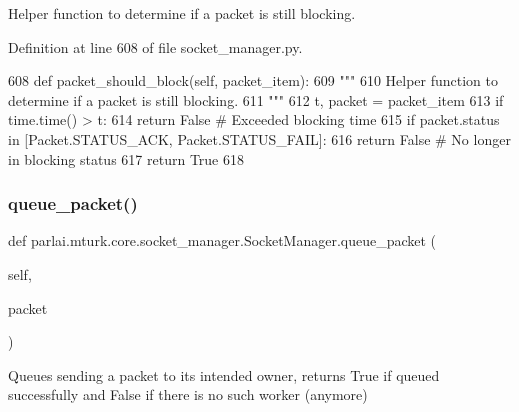 \begin{DoxyVerb}Helper function to determine if a packet is still blocking.
\end{DoxyVerb}
 

Definition at line 608 of file socket\+\_\+manager.\+py.


\begin{DoxyCode}
608     \textcolor{keyword}{def }packet\_should\_block(self, packet\_item):
609         \textcolor{stringliteral}{"""}
610 \textcolor{stringliteral}{        Helper function to determine if a packet is still blocking.}
611 \textcolor{stringliteral}{        """}
612         t, packet = packet\_item
613         \textcolor{keywordflow}{if} time.time() > t:
614             \textcolor{keywordflow}{return} \textcolor{keyword}{False}  \textcolor{comment}{# Exceeded blocking time}
615         \textcolor{keywordflow}{if} packet.status \textcolor{keywordflow}{in} [Packet.STATUS\_ACK, Packet.STATUS\_FAIL]:
616             \textcolor{keywordflow}{return} \textcolor{keyword}{False}  \textcolor{comment}{# No longer in blocking status}
617         \textcolor{keywordflow}{return} \textcolor{keyword}{True}
618 
\end{DoxyCode}
\mbox{\label{classparlai_1_1mturk_1_1core_1_1socket__manager_1_1SocketManager_a91c7216d011823f1c6c4963d863638c8}} 
\subsubsection{\texorpdfstring{queue\+\_\+packet()}{queue\_packet()}}
{\footnotesize\ttfamily def parlai.\+mturk.\+core.\+socket\+\_\+manager.\+Socket\+Manager.\+queue\+\_\+packet (\begin{DoxyParamCaption}\item[{}]{self,  }\item[{}]{packet }\end{DoxyParamCaption})}

\begin{DoxyVerb}Queues sending a packet to its intended owner, returns True if queued
successfully and False if there is no such worker (anymore)
\end{DoxyVerb}
 

